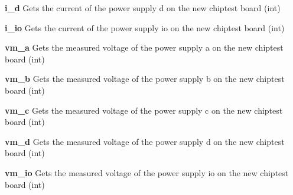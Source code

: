 \begin{DoxyItemize}
\item {\bfseries i\_\-d} Gets the current of the power supply d on the new chiptest board (int)
\end{DoxyItemize}


\begin{DoxyItemize}
\item {\bfseries i\_\-io} Gets the current of the power supply io on the new chiptest board (int)
\end{DoxyItemize}


\begin{DoxyItemize}
\item {\bfseries vm\_\-a} Gets the measured voltage of the power supply a on the new chiptest board (int)
\end{DoxyItemize}


\begin{DoxyItemize}
\item {\bfseries vm\_\-b} Gets the measured voltage of the power supply b on the new chiptest board (int)
\end{DoxyItemize}


\begin{DoxyItemize}
\item {\bfseries vm\_\-c} Gets the measured voltage of the power supply c on the new chiptest board (int)
\end{DoxyItemize}


\begin{DoxyItemize}
\item {\bfseries vm\_\-d} Gets the measured voltage of the power supply d on the new chiptest board (int)
\end{DoxyItemize}


\begin{DoxyItemize}
\item {\bfseries vm\_\-io} Gets the measured voltage of the power supply io on the new chiptest board (int) 
\end{DoxyItemize}